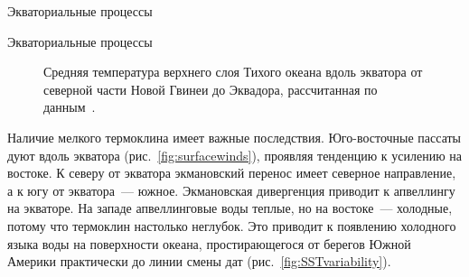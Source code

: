 \begin{chapter}{Экваториальные процессы}
\begin{section}{Экваториальные процессы}
\begin{figure}[t!]
\begin{centering}
\end{centering}
\caption{Средняя температура верхнего слоя Тихого океана вдоль экватора от
северной части Новой Гвинеи до Эквадора, рассчитанная по 
данным~\cite{Levitus:1982}.}  
\label{fig:equator}
\vspace{-2ex}
\end{figure}
%
%

Наличие мелкого термоклина имеет важные последствия. 
Юго-восточные пассаты дуют вдоль экватора (рис.~\ref{fig:surfacewinds}), 
проявляя тенденцию к усилению на востоке. 
К северу от экватора экмановский перенос%
 имеет
северное направление, а к югу от экватора~--- южное. Экмановская дивергенция
приводит к апвеллингу  на экваторе. На западе
апвеллинговые воды теплые, но на востоке~--- холодные, потому что термоклин
настолько неглубок. Это приводит к появлению холодного языка воды на
поверхности океана, простирающегося от берегов Южной Америки
практически до линии смены дат (рис.~\ref{fig:SSTvariability}). 
%



\end{section}
\end{chapter}
